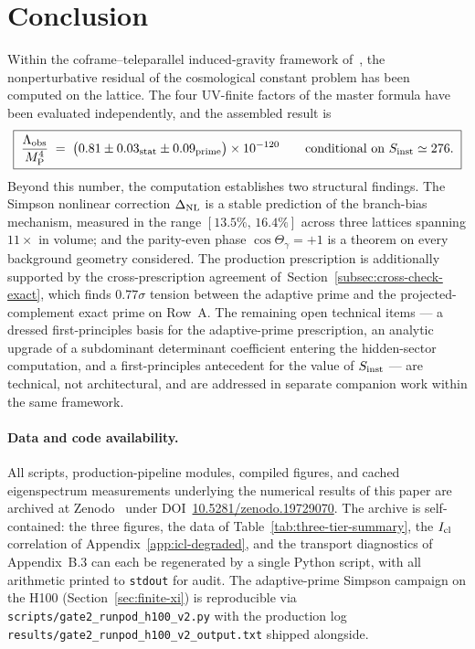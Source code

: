 \documentclass[a4paper,11pt]{article}
\theoremstyle{definition}
\newcommand{\MP}{M_{\rm P}}
\newcommand{\Lobs}{\Lambda_{\rm obs}}
\begin{document}
\section{Conclusion}
\label{sec:conclusion}

Within the coframe--teleparallel induced-gravity framework
of~\cite{companion-structural}, the nonperturbative residual of
the cosmological constant problem has been computed on the
lattice. The four UV-finite factors of the master formula have
been evaluated independently, and the assembled result is
\[
\boxed{\;
\frac{\Lobs}{\MP^4}
\;=\;
\bigl(0.81 \pm 0.03_{\rm stat} \pm 0.09_{\rm prime}\bigr) \times 10^{-120}
\qquad\text{conditional on}\ S_{\rm inst} \simeq 276.
\;}
\]
Beyond this number, the computation establishes two structural
findings. The Simpson nonlinear correction $\Delta_{\rm NL}$ is a
stable prediction of the branch-bias mechanism, measured in the
range $[13.5\%,\,16.4\%]$ across three lattices spanning $11\times$
in volume; and the parity-even phase $\cos\Theta_\gamma = +1$ is a
theorem on every background geometry considered. The production
prescription is additionally supported by the cross-prescription
agreement of~Section~\ref{subsec:cross-check-exact}, which finds
$0.77\sigma$ tension between the adaptive prime and the
projected-complement exact prime on Row~A. The remaining open
technical items --- a dressed first-principles basis for the
adaptive-prime prescription, an analytic upgrade of a subdominant
determinant coefficient entering the hidden-sector computation,
and a first-principles antecedent for the value of
$S_{\rm inst}$ --- are technical, not architectural, and are
addressed in separate companion work within the same framework.

\paragraph*{Data and code availability.}
All scripts, production-pipeline modules, compiled figures, and
cached eigenspectrum measurements underlying the numerical results
of this paper are archived at Zenodo~\cite{Hanash2026Archive} under
DOI~\href{https://doi.org/10.5281/zenodo.19729070}{10.5281/zenodo.19729070}.
The archive is self-contained: the three figures, the data of
Table~\ref{tab:three-tier-summary}, the $I_{\rm cl}$ correlation of
Appendix~\ref{app:icl-degraded}, and the transport diagnostics of
Appendix~B.3 can each be regenerated by a single Python script,
with all arithmetic printed to \texttt{stdout} for audit. The
adaptive-prime Simpson campaign on the H100 (Section~\ref{sec:finite-xi})
is reproducible via \texttt{scripts/gate2\_runpod\_h100\_v2.py} with
the production log \texttt{results/gate2\_runpod\_h100\_v2\_output.txt}
shipped alongside.
\end{document}
